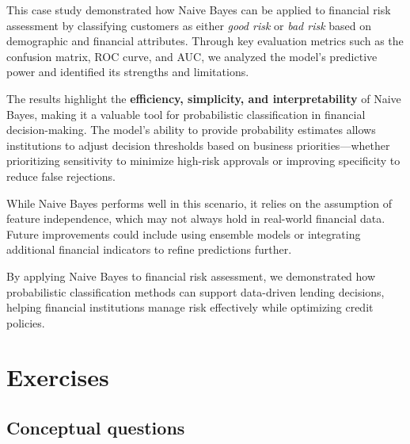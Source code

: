\documentclass[
  11pt,
]{book}
\theoremstyle{definition}
\theoremstyle{definition}
\theoremstyle{definition}
\theoremstyle{definition}
\theoremstyle{remark}
\begin{document}
This case study demonstrated how Naive Bayes can be applied to financial risk assessment by classifying customers as either \emph{good risk} or \emph{bad risk} based on demographic and financial attributes. Through key evaluation metrics such as the confusion matrix, ROC curve, and AUC, we analyzed the model's predictive power and identified its strengths and limitations.

The results highlight the \textbf{efficiency, simplicity, and interpretability} of Naive Bayes, making it a valuable tool for probabilistic classification in financial decision-making. The model's ability to provide probability estimates allows institutions to adjust decision thresholds based on business priorities---whether prioritizing sensitivity to minimize high-risk approvals or improving specificity to reduce false rejections.

While Naive Bayes performs well in this scenario, it relies on the assumption of feature independence, which may not always hold in real-world financial data. Future improvements could include using ensemble models or integrating additional financial indicators to refine predictions further.

By applying Naive Bayes to financial risk assessment, we demonstrated how probabilistic classification methods can support data-driven lending decisions, helping financial institutions manage risk effectively while optimizing credit policies.

\section{Exercises}\label{exercises-7}

\subsection*{Conceptual questions}\label{conceptual-questions-5}
\end{document}

